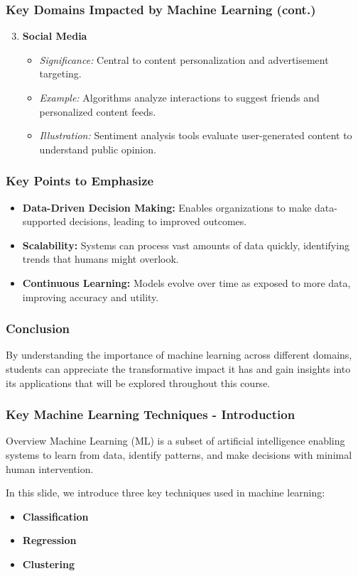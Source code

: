 \documentclass[aspectratio=169]{beamer}
\begin{document}
\begin{frame}[fragile]
    \frametitle{Key Domains Impacted by Machine Learning (cont.)}
    \begin{enumerate}
        \setcounter{enumi}{2}
        \item \textbf{Social Media}
            \begin{itemize}
                \item \textit{Significance:} Central to content personalization and advertisement targeting.
                \item \textit{Example:} Algorithms analyze interactions to suggest friends and personalized content feeds.
                \item \textit{Illustration:} Sentiment analysis tools evaluate user-generated content to understand public opinion.
            \end{itemize}
    \end{enumerate}
\end{frame}

\begin{frame}[fragile]
    \frametitle{Key Points to Emphasize}
    \begin{itemize}
        \item \textbf{Data-Driven Decision Making:} Enables organizations to make data-supported decisions, leading to improved outcomes.
        \item \textbf{Scalability:} Systems can process vast amounts of data quickly, identifying trends that humans might overlook.
        \item \textbf{Continuous Learning:} Models evolve over time as exposed to more data, improving accuracy and utility.
    \end{itemize}
\end{frame}

\begin{frame}[fragile]
    \frametitle{Conclusion}
    By understanding the importance of machine learning across different domains, students can appreciate the transformative impact it has and gain insights into its applications that will be explored throughout this course.
\end{frame}

\begin{frame}[fragile]
  \frametitle{Key Machine Learning Techniques - Introduction}
  \begin{block}{Overview}
    Machine Learning (ML) is a subset of artificial intelligence enabling systems to learn from data, identify patterns, and make decisions with minimal human intervention.
  \end{block}
  
  In this slide, we introduce three key techniques used in machine learning:
  \begin{itemize}
    \item \textbf{Classification}
    \item \textbf{Regression}
    \item \textbf{Clustering}
  \end{itemize}
\end{frame}
\end{document}

